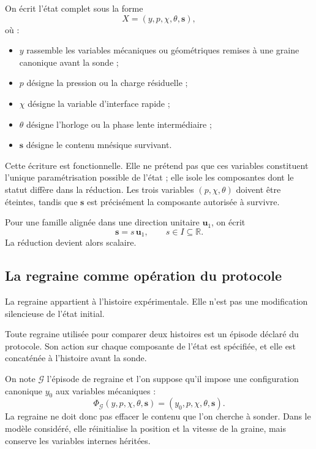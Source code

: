 On écrit l'état complet sous la forme
\[
X=(y,p,\chi,\theta,\mathbf s),
\]
où :
\begin{itemize}
\item $y$ rassemble les variables mécaniques ou géométriques remises à
  une graine canonique avant la sonde ;
\item $p$ désigne la pression ou la charge résiduelle ;
\item $\chi$ désigne la variable d'interface rapide ;
\item $\theta$ désigne l'horloge ou la phase lente intermédiaire ;
\item $\mathbf s$ désigne le contenu mnésique survivant.
\end{itemize}

Cette écriture est fonctionnelle. Elle ne prétend pas que ces variables
constituent l'unique paramétrisation possible de l'état ; elle isole les
composantes dont le statut diffère dans la réduction. Les trois
variables $(p,\chi,\theta)$ doivent être éteintes, tandis que
$\mathbf s$ est précisément la composante autorisée à survivre.

Pour une famille alignée dans une direction unitaire $\mathbf u_1$, on
écrit
\[
\mathbf s=s\,\mathbf u_1,
\qquad s\in I\subseteq\mathbb R.
\]
La réduction devient alors scalaire.

\subsection{La regraine comme opération du protocole}
\label{annexe-H-regraine}

La regraine appartient à l'histoire expérimentale. Elle n'est pas une
modification silencieuse de l'état initial.

\begin{encadre}[title={A-H1 --- Appartenance de la regraine au protocole}]
Toute regraine utilisée pour comparer deux histoires est un épisode
déclaré du protocole. Son action sur chaque composante de l'état est
spécifiée, et elle est concaténée à l'histoire avant la sonde.
\end{encadre}

On note $\mathcal G$ l'épisode de regraine et l'on suppose qu'il impose
une configuration canonique $y_0$ aux variables mécaniques :
\begin{equation}
\label{eq:annexe-H-regraine}
\Phi_{\mathcal G}(y,p,\chi,\theta,\mathbf s)
=
(y_0,p,\chi,\theta,\mathbf s).
\end{equation}
La regraine ne doit donc pas effacer le contenu que l'on cherche à
sonder. Dans le modèle considéré, elle réinitialise la position et la
vitesse de la graine, mais conserve les variables internes héritées.

